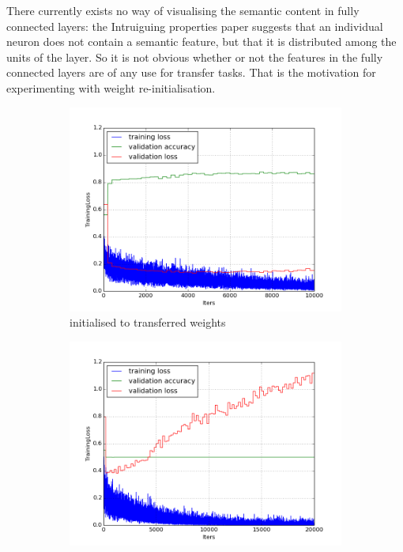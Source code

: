\documentclass[a4paper,11pt]{article}
\begin{document}
There currently exists no way of visualising the semantic content in fully connected layers: the Intruiguing properties paper suggests that an individual neuron does not contain a semantic feature, but that it is distributed among the units of the layer. So it is not obvious whether or not the features in the fully connected layers are of any use for transfer tasks. That is the motivation for experimenting with weight re-initialisation. \\

\begin{figure}
    \centering
    \begin{minipage}[b]{\textwidth}
      \begin{subfigure}{.5\textwidth} 
        \centering
        \includegraphics[scale=0.4]{images/plot_clampdet_none-10k.png}
        \caption{initialised to transferred weights}\label{fig:2a}
      \end{subfigure}%
      \begin{subfigure}{.5\textwidth} 
        \centering
        \includegraphics[scale=0.4]{images/plot_clampdet_none_reinit.png}

\end{subfigure}
\end{minipage}
\end{figure}
\end{document}
